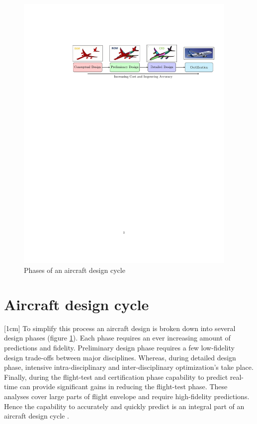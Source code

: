 \begin{figure}[!ht]
\label{figPhasesOfAircraftDesign}
  \centering
  
    \includegraphics[clip, trim=4.5cm 19cm 0.5cm 4cm,width=0.95\textwidth]
    {images/part1/aircraftDesignCycleFlowChart}
  
  \caption{Phases of an aircraft design cycle}
\end{figure}

\section{Aircraft design cycle}\label{secSircraftDesignCycle}
[1cm]
To simplify this process an aircraft design is broken down into several design phases (figure \ref{figPhasesOfAircraftDesign}). Each phase requires an ever increasing amount of predictions and fidelity. Preliminary design phase requires a few low-fidelity design trade-offs between major disciplines. Whereas, during detailed design phase, intensive intra-disciplinary and inter-disciplinary optimization's take place. Finally, during the flight-test and certification phase capability to predict real-time can provide significant gains in reducing the flight-test phase. These analyses cover large parts of flight envelope and require high-fidelity predictions. Hence the capability to accurately and quickly predict is an integral part of an aircraft design cycle \cite{raymer2012aircraft}. 

